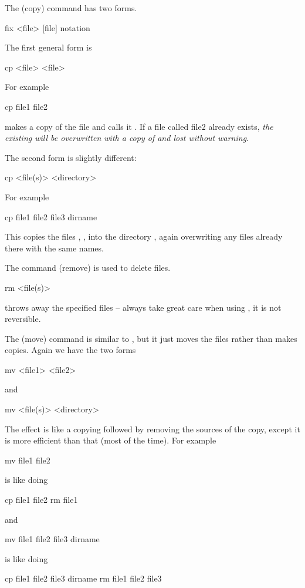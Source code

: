 \noindent The  (copy) command has two forms.

\begin{note}
  fix <file> [file] notation
\end{note}

The first general form is
\begin{ttoutenv}
  cp <file> <file> \return
\end{ttoutenv}

For example

\begin{ttoutenv}
  cp file1 file2 \return
\end{ttoutenv}
%
makes a copy of the file  and calls it .  If
a file called file2 already exists, \emph{the existing  will be  overwritten
with a copy of  and lost without warning}.

The second form is slightly different:
\begin{ttoutenv}
  cp <file(s)> <directory>
\end{ttoutenv}
%
For example

\begin{ttoutenv}
  cp file1 file2 file3 dirname \return
\end{ttoutenv}

This copies the files , ,  into
the directory , again overwriting any files already
there with the same names.

The command  (remove) is used to delete files.
\begin{ttoutenv}
  rm <file(s)>
\end{ttoutenv}
%
throws away the specified files -- always take great care when using
, it is not reversible.

The  (move) command is similar to , but it just moves
the files rather than makes copies. Again we have the two forms
\begin{ttoutenv}
  mv <file1> <file2> \return
\end{ttoutenv}
and
\begin{ttoutenv}
  mv <file(s)> <directory> \return
\end{ttoutenv}

The effect is like a copying followed by removing the sources of the copy,
except it is more efficient than that (most of the time).
For example
\begin{ttoutenv}
  mv file1 file2 \return
\end{ttoutenv}
is like doing
\begin{ttoutenv}
  cp file1 file2 \return
  rm file1
\end{ttoutenv}
and
\begin{ttoutenv}
  mv file1 file2 file3 dirname \return
\end{ttoutenv}
is like doing
\begin{ttoutenv}
  cp file1 file2 file3 dirname \return
  rm file1 file2 file3
\end{ttoutenv}

